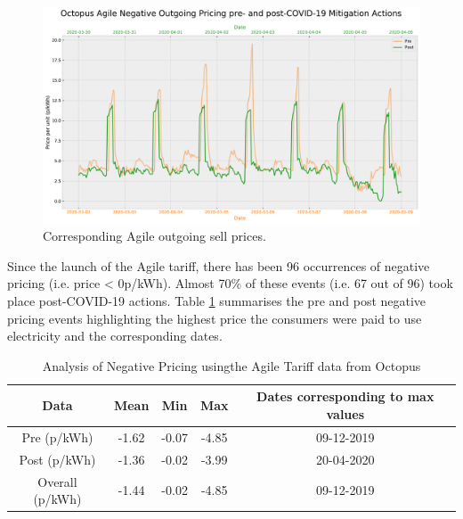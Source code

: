\documentclass[energies,article,submit,moreauthors,pdftex]{Definitions/mdpi}
\begin{document}
\begin{figure}[H]\centering
\hspace{-25pt}\includegraphics[width=15 cm]{Graphics/Pre-post_AgileOUTGO_negative_comp.pdf}
\caption{Corresponding Agile outgoing sell prices.}\label{fig:neg_agile_comp_prepost}
\end{figure}  

Since the launch of the Agile tariff, there has been 96 occurrences of negative pricing (i.e. price < 0p/kWh). Almost 70\% of these events (i.e. 67 out of 96) took place post-COVID-19 actions. Table \ref{table:neg_agile_table} summarises the pre and post negative pricing events highlighting the highest price the consumers were paid to use electricity and the corresponding dates.

\begin{table}[H]
\caption{Analysis of Negative Pricing usingthe  Agile Tariff data from Octopus \cite{AgileEnergy} }\label{table:neg_agile_table}
\centering
\begin{tabular}{ccccc }
\toprule
\textbf{Data} & \textbf{Mean}	& \textbf{Min}	& \textbf{Max}& Dates corresponding to max values\\
\midrule
Pre	(p/kWh)	& -1.62			& -0.07         & -4.85 &09-12-2019\\
Post (p/kWh) & -1.36			& -0.02         & -3.99& 20-04-2020\\
Overall (p/kWh) & -1.44			& -0.02         & -4.85 &09-12-2019\\
\bottomrule
\end{tabular}
\end{table}


\end{document}
